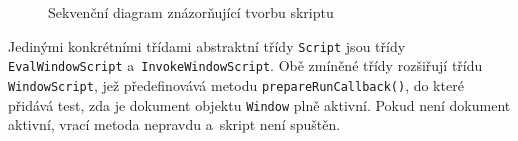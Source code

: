 \begin{figure}[H]
  \begin{center}
    \caption{Sekvenční diagram znázorňující tvorbu skriptu}
    \label{Figure.CreateScript}
  \end{center}
\end{figure}

\vspace{-1em}

Jedinými konkrétními třídami abstraktní třídy \texttt{Script} jsou třídy \texttt{EvalWindowScript} a~\texttt{InvokeWindowScript}. Obě zmíněné třídy rozšiřují třídu \texttt{WindowScript}, jež předefinovává metodu \texttt{prepareRunCallback()}, do které přidává test, zda je dokument objektu \texttt{Window} plně aktivní. Pokud není dokument aktivní, vrací metoda nepravdu a~skript není spuštěn.

